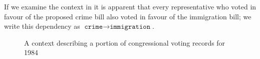 If we examine the context in  it is apparent that every representative who voted in favour of the proposed crime bill also voted in favour of the immigration bill; we write this dependency as $\texttt{crime} \rightarrow \texttt{immigration}$.



\begin{figure}[H]
\centering
    \begin{cxt}
    \end{cxt}
    \caption{A context describing a portion of congressional voting records for 1984}
    \label{context:voting-records-small}
\end{figure}

\clearpage

